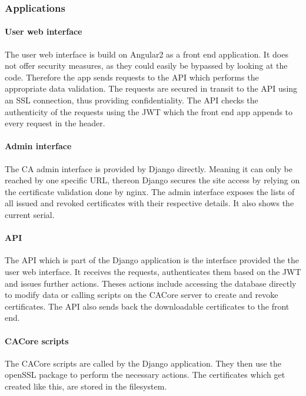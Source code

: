 \documentclass[english]{article}
\begin{document}
\subsubsection{Applications}

\paragraph{User web interface}

The user web interface is build on Angular2 as a front end application. It does not offer security measures, as they could easily be bypassed by looking at the code. Therefore the app sends requests to the API which performs the appropriate data validation. The requests are secured in transit to the API using an SSL connection, thus providing confidentiality. The API checks the authenticity of the requests using the JWT which the front end app appends to every request in the header.

\paragraph{Admin interface}

The CA admin interface is provided by Django directly. Meaning it can only be reached by one specific URL, thereon Django secures the site access by relying on the certificate validation done by nginx. The admin interface exposes the lists of all issued and revoked certificates with their respective details. It also shows the current serial.

\paragraph{API}
The API which is part of the Django application is the interface provided the the user web interface. It receives the requests, authenticates them based on the JWT and issues further actions. Theses actions include accessing the database directly to modify data or calling scripts on the CACore server to create and revoke certificates. The API also sends back the downloadable certificates to the front end.

\paragraph{CACore scripts}
The CACore scripts are called by the Django application. They then use the openSSL package to perform the necessary actions. The certificates which get created like this, are stored in the filesystem.
\end{document}
